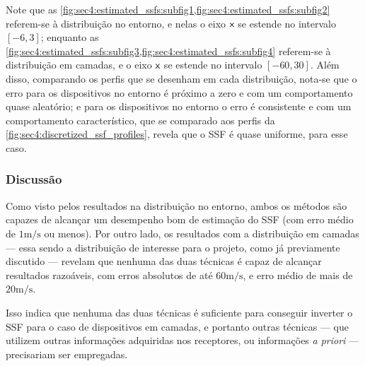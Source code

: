 Note que as \cref{fig:sec4:estimated_ssfs:subfig1,fig:sec4:estimated_ssfs:subfig2} referem-se à distribuição no entorno, e nelas o eixo ${\textsf{x}}$ se estende no intervalo $[-6, 3]$; enquanto as \cref{fig:sec4:estimated_ssfs:subfig3,fig:sec4:estimated_ssfs:subfig4} referem-se à distribuição em camadas, e o eixo ${\textsf{x}}$ se estende no intervalo $[-60, 30]$. Além disso, comparando os perfis que se desenham em cada distribuição, nota-se que o erro para os dispositivos no entorno é próximo a zero e com um comportamento quase aleatório; e para os dispositivos no entorno o erro é consistente e com um comportamento característico, que se comparado aos perfis da \cref{fig:sec4:discretized_ssf_profiles}, revela que o SSF é quase uniforme, para esse caso.

\subsubsection*{Discussão}

Como visto pelos resultados na distribuição no entorno, ambos os métodos são capazes de alcançar um desempenho bom de estimação do SSF (com erro médio de $1\si{\meter/\second}$ ou menos). Por outro lado, os resultados com a distribuição em camadas --- essa sendo a distribuição de interesse para o projeto, como já previamente discutido --- revelam que nenhuma das duas técnicas é capaz de alcançar resultados razoáveis, com erros absolutos de até $60\si{\meter/\second}$, e erro médio de mais de $20\si{\meter/\second}$.

Isso indica que nenhuma das duas técnicas é suficiente para conseguir inverter o SSF para o caso de dispositivos em camadas, e portanto outras técnicas --- que utilizem outras informações adquiridas nos receptores, ou informações \textsl{a priori} --- precisariam ser empregadas.
